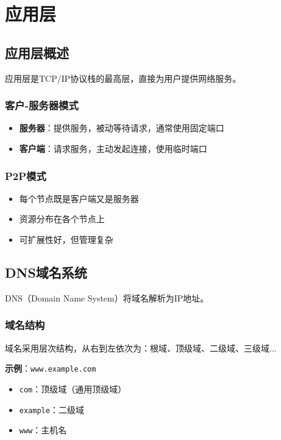 \chapter{应用层}
\section{应用层概述}
应用层是TCP/IP协议栈的最高层，直接为用户提供网络服务。

\subsection{客户-服务器模式}
\begin{itemize}[leftmargin=2em,itemsep=0pt]
    \item \textbf{服务器}：提供服务，被动等待请求，通常使用固定端口
    \item \textbf{客户端}：请求服务，主动发起连接，使用临时端口
\end{itemize}

\subsection{P2P模式}
\begin{itemize}[leftmargin=2em,itemsep=0pt]
    \item 每个节点既是客户端又是服务器
    \item 资源分布在各个节点上
    \item 可扩展性好，但管理复杂
\end{itemize}

\section{DNS域名系统}
DNS（Domain Name System）将域名解析为IP地址。

\subsection{域名结构}
域名采用层次结构，从右到左依次为：根域、顶级域、二级域、三级域...

\textbf{示例}：\texttt{www.example.com}
\begin{itemize}[leftmargin=2em,itemsep=0pt]
    \item \texttt{com}：顶级域（通用顶级域）
    \item \texttt{example}：二级域
    \item \texttt{www}：主机名
\end{itemize}

